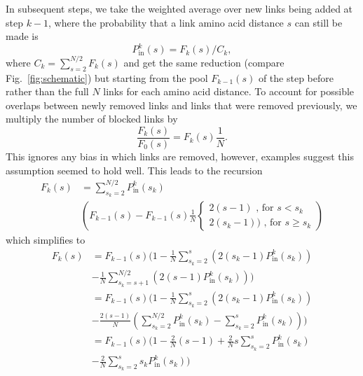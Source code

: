 \documentclass[
reprint,
twocolumn,
amsmath,amssymb,superscriptaddress,aps,
pre]{revtex4-1}
\newcommand{\Pin}{P_{\mathrm{in}}}
\begin{document}
In subsequent steps, we take the weighted average over new links being added at step $k-1$, where the probability that a link amino acid distance $s$ can still be made is
\begin{equation}
    \Pin^k(s)=F_k(s)/C_k,
\end{equation}
where $C_k=\sum_{s=2}^{N/2}F_k(s)$ and get the same reduction (compare Fig.~\ref{fig:schematic}) but starting from the pool $F_{k-1}(s)$ of the step before rather than the full $N$ links for each amino acid distance. To account for possible overlaps between newly removed links and links that were removed previously, we multiply the number of blocked links by
\begin{equation}
    \frac{F_k(s)}{F_0(s)} = F_k(s)\frac{1}{N}.
    \label{eq.Pk}
\end{equation}
This ignores any bias in which links are removed, however, examples suggest this assumption seemed to hold well. 
This leads to the recursion
\begin{align}
    F_k(s)&= \sum_{s_k=2}^{N/2} \Pin^k(s_k)\nonumber \\
    & \left(F_{k-1}(s)-  F_{k-1}(s)\frac{1}{N}
    {\begin{cases}
     2(s-1) \text{ , for } s<s_k\\
     2(s_k -1))\text{ , for } s\geq s_k
    \end{cases}} \right)
\end{align}
which simplifies to
\begin{align}
   F_k(s)&=F_{k-1}(s)(1-\frac{1}{N} \sum_{s_k=2}^{s} (2 (s_k-1) \Pin^k(s_k))\nonumber \\
   &-\frac{1}{N} \sum_{s_k=s+1}^{N/2} (2 (s-1) \Pin^k(s_k)))\nonumber \\
   &=F_{k-1}(s)(1-\frac{1}{N}
   \sum_{s_k=2}^{s} (2 (s_k-1) \Pin^k(s_k))\nonumber \\
   &-\frac{2 (s-1)}{N} (\sum_{s_k=2}^{N/2} \Pin^k(s_k) - \sum_{s_k=2}^{s} \Pin^k(s_k)))\nonumber \\
   &=F_{k-1}(s)(1-\frac{2}{N} (s-1) 
   +\frac{2}{N} s
   \sum_{s_k=2}^{s}\Pin^k(s_k)\nonumber \\
   &-\frac{2}{N}
   \sum_{s_k=2}^{s} s_k \Pin^k(s_k))
   \label{eq.Fk_rec}
\end{align}
\end{document}
